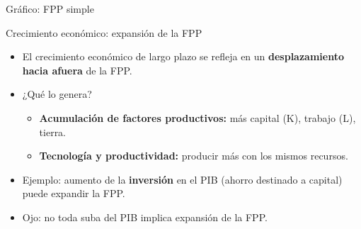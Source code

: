 \documentclass{beamer}
\begin{document}
\begin{frame}{Gráfico: FPP simple}
    \begin{center}
    \end{center}
\end{frame}

\begin{frame}{Crecimiento económico: expansión de la FPP}
    \begin{itemize}
        \item El crecimiento económico de largo plazo se refleja en un \textbf{desplazamiento hacia afuera} de la FPP.
        \item ¿Qué lo genera?
        \begin{itemize}
            \item \textbf{Acumulación de factores productivos:} más capital (K), trabajo (L), tierra.
            \item \textbf{Tecnología y productividad:} producir más con los mismos recursos.
        \end{itemize}
        \item Ejemplo: aumento de la \textbf{inversión} en el PIB (ahorro destinado a capital) puede expandir la FPP.
        \item Ojo: no toda suba del PIB implica expansión de la FPP.
    \end{itemize}
\end{frame}
\end{document}
